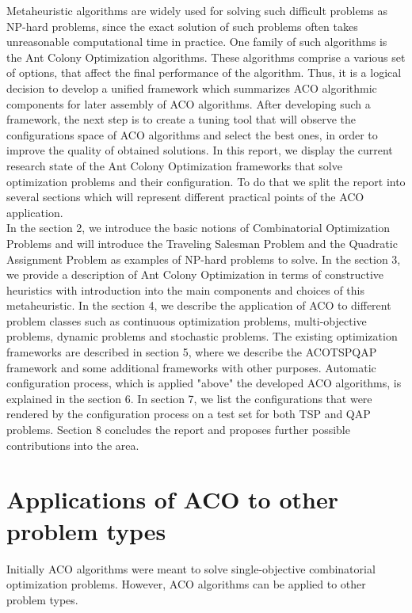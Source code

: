 \documentclass[12pt]{article}
\begin{document}
Metaheuristic algorithms are widely used for solving such difficult problems as NP-hard problems, since the exact solution of such problems often takes unreasonable computational time in practice. One family of such algorithms is the Ant Colony Optimization algorithms. These algorithms comprise a various set of options, that affect the final performance of the algorithm. Thus, it is a logical decision to develop a unified framework which summarizes ACO algorithmic components for later assembly of ACO algorithms. After developing such a framework, the next step is to create a tuning tool that will observe the configurations space of ACO algorithms and select the best ones, in order to improve the quality of obtained solutions.
In this report, we display the current research state of the Ant Colony Optimization frameworks that solve optimization problems and their configuration. To do that we split the report into several sections which will represent different practical points of the ACO application. \\
In the section 2, we introduce the basic notions of  Combinatorial Optimization Problems and will introduce the Traveling Salesman Problem and the Quadratic Assignment Problem as examples of NP-hard problems to solve. In the section 3, we provide a description of Ant Colony Optimization in terms of constructive heuristics with introduction into the main components and choices of this metaheuristic. In the section 4, we describe the application of ACO to different problem classes such as continuous optimization problems, multi-objective problems, dynamic problems and stochastic problems.
The existing optimization frameworks are described in section 5, where we describe the ACOTSPQAP framework and some additional frameworks with other purposes.
Automatic configuration process, which is applied "above" the developed ACO algorithms, is explained in the section 6.
In section 7, we list the configurations that were rendered by the configuration process on a test set for both TSP and QAP problems.
Section 8 concludes the report and proposes further possible contributions into the area.




\section{Applications of ACO to other problem types}
Initially ACO algorithms were meant to solve single-objective combinatorial optimization problems. However, ACO algorithms can be applied to other problem types.
\end{document}
